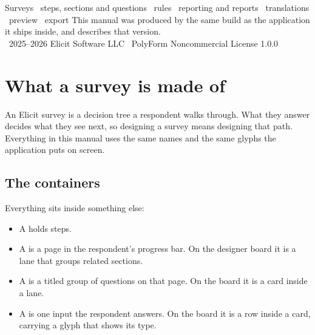 \documentclass[11pt, a4paper]{article}
\begin{document}
%
  {Surveys \textperiodcentered\ steps, sections and questions \textperiodcentered\ rules \textperiodcentered\ reporting and reports \textperiodcentered\ translations \textperiodcentered\ preview \textperiodcentered\ export}%
  {This manual was produced by the same build as the application it ships inside, and describes that version.\\[0.5em] \textcopyright\ 2025--2026 Elicit Software LLC \textperiodcentered\ PolyForm Noncommercial License 1.0.0}

\setcounter{page}{1}
\elicitContents

\clearpage
{}
\setcounter{page}{1}

\section{What a survey is made of}
\label{sec:model}

An Elicit survey is a decision tree a respondent walks through. What they answer decides what
they see next, so designing a survey means designing that path. Everything in this manual uses
the same names and the same glyphs the application puts on screen.

\subsection{The containers}

Everything sits inside something else:

\begin{itemize}
  \item A  holds steps.
  \item A  is a page in the respondent's progress bar. On the designer board it is a
        lane that groups related sections.
  \item A  is a titled group of questions on that page. On the board it is a card
        inside a lane.
  \item A  is one input the respondent answers. On the board it is a row inside a
        card, carrying a glyph that shows its type.
\end{itemize}
\end{document}
